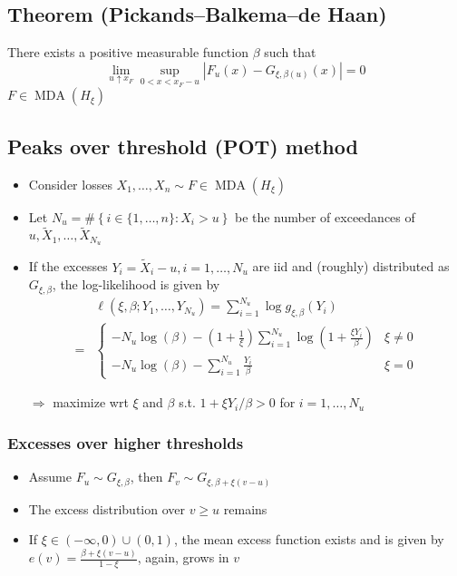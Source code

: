 \subsection*{Theorem (Pickands–Balkema–de Haan)}
There exists a positive measurable function $\beta$ such that
$$
\lim _{u \uparrow x_{F}} \sup _{0<x<x_{F}-u}\left|F_{u}(x)-G_{\xi, \beta(u)}(x)\right|=0
$$
 $F \in \operatorname{MDA}\left(H_{\xi}\right)$




\subsection*{Peaks over threshold (POT) method}
\begin{itemize}[leftmargin=*]
    \item Consider losses $X_{1}, \ldots, X_{n} \sim F \in \operatorname{MDA}\left(H_{\xi}\right)$
    \item Let $N_{u}=\#\left\{i \in\{1, \ldots, n\}: X_{i}>u\right\}$ be the number of exceedances of $u, \tilde{X}_{1}, \ldots, \tilde{X}_{N_{u}}$
    \item If the excesses $Y_{i}=\tilde{X}_{i}-u, i=1, \ldots, N_{u}$ are iid and (roughly) distributed as $G_{\xi, \beta}$, the log-likelihood is given by
$$
\displaystyle \begin{aligned}
&\ell\left(\xi, \beta ; Y_{1}, \ldots, Y_{N_{u}}\right)=\sum_{i=1}^{N_{u}} \log g_{\xi, \beta}\left(Y_{i}\right) \\
=&  \begin{cases}-N_{u} \log (\beta)-(1+ \frac{1}{\xi}) \displaystyle \sum_{i=1}^{N_{u}} \log \left(1+ \frac{\xi Y_{i}}{\beta} \right) & \xi \neq 0 \\ -N_{u} \log (\beta)-\displaystyle \sum_{i=1}^{N_{u}} \frac{Y_{i}}{\beta} & \xi=0\end{cases}
\end{aligned}
$$

$\Rightarrow$ maximize wrt $\xi$ and $\beta$ s.t. $1+\xi Y_{i} / \beta>0$ for $i=1, \ldots, N_{u}$
\end{itemize}





\subsubsection*{Excesses over higher thresholds}
\begin{itemize}[leftmargin=*]
    \item Assume $F_{u} \sim G_{\xi, \beta}$, then $F_{v} \sim G_{\xi, \beta+\xi(v-u)}$
    \item The excess distribution over $v \geq u$ remains 
    \item If $\xi \in(-\infty, 0) \cup(0,1)$, the mean excess function exists and is given by
$
e(v)=\frac{\beta+\xi(v-u)}{1-\xi}
$, again, grows  in $v$
\end{itemize}





